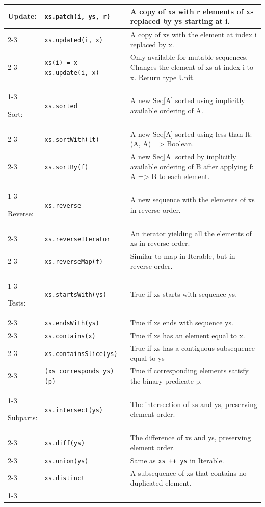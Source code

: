 \documentclass[article, a5paper]{memoir}
\begin{document}
{\begin{tabular}{@{}l p{3.75cm} p{6.8cm}}
  Update: & \texttt{xs.patch(i, ys, r)} &  A copy of xs with r elements of xs replaced by ys starting at i. \\   \cline{2-3}
   & \texttt{xs.updated(i, x)} & A copy of xs with the element at index i replaced by x.\\\cline{2-3}
   & \texttt{xs(i) = x \newline xs.update(i, x)} & Only available for mutable sequences. Changes the element of xs at index i to x. Return type Unit.\\\cline{1-3}


  Sort: & \texttt{xs.sorted} & A new Seq[A] sorted using implicitly available ordering of A. \\   \cline{2-3}
   & \texttt{xs.sortWith(lt)} &  	A new Seq[A] sorted using less than lt: (A, A) => Boolean.\\\cline{2-3}
   & \texttt{xs.sortBy(f)}   &  	A new Seq[A] sorted by implicitly available ordering of B after applying f: A => B to each element.\\ \cline{1-3}


Reverse: & \texttt{xs.reverse} & A new sequence with the elements of xs in reverse order. \\   \cline{2-3}
   & \texttt{xs.reverseIterator} & An iterator yielding all the elements of xs in reverse order.\\\cline{2-3}
   & \texttt{xs.reverseMap(f)} & Similar to map in Iterable, but in reverse order.\\\cline{1-3}


  Tests: & \texttt{xs.startsWith(ys)} & True if xs starts with sequence ys. \\   \cline{2-3}
   & \texttt{xs.endsWith(ys)} & True if xs ends with sequence ys.\\\cline{2-3}
   & \texttt{xs.contains(x)} & True if xs has an element equal to x.\\\cline{2-3}
   & \texttt{xs.containsSlice(ys)} & True if xs has a contiguous subsequence equal to ys\\\cline{2-3}
   & \texttt{(xs corresponds ys)(p)} & True if corresponding elements satisfy the binary predicate p.\\\cline{1-3}

  Subparts: & \texttt{xs.intersect(ys)} & The intersection of xs and ys, preserving element order.\\\cline{2-3}
   & \texttt{xs.diff(ys)} & The difference of xs and ys, preserving element order.\\\cline{2-3}
   & \texttt{xs.union(ys)} & Same as \texttt{xs ++ ys} in Iterable.\\\cline{2-3}
   & \texttt{xs.distinct} & A subsequence of xs that contains no duplicated element.\\\cline{1-3}



\end{tabular}
}
\end{document}
